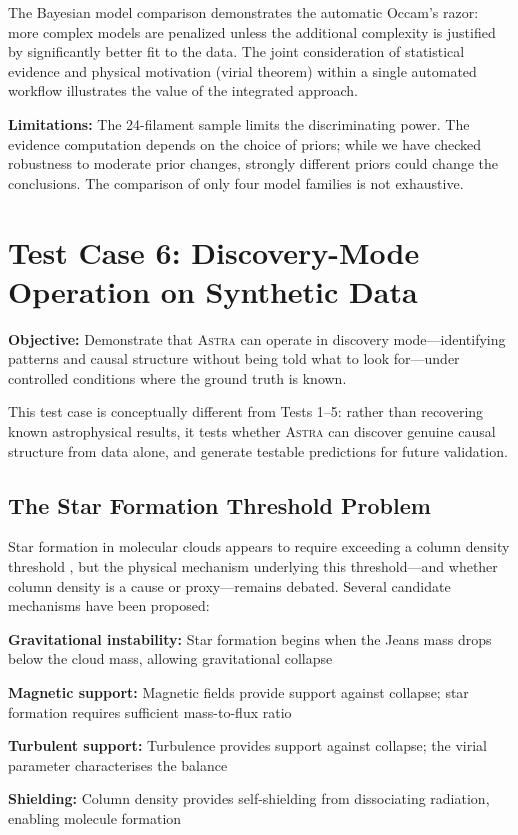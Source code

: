 \documentclass[usenatbib]{rasti}
\newcommand{\astra}{\textsc{Astra}\xspace}
\begin{document}
The Bayesian model comparison demonstrates the automatic Occam's razor: more complex models are penalized unless the additional complexity is justified by significantly better fit to the data.
The joint consideration of statistical evidence and physical motivation (virial theorem) within a single automated workflow illustrates the value of the integrated approach.

\textbf{Limitations:}
The 24-filament sample limits the discriminating power.
The evidence computation depends on the choice of priors; while we have checked robustness to moderate prior changes, strongly different priors could change the conclusions.
The comparison of only four model families is not exhaustive.

\section{Test Case 6: Discovery-Mode Operation on Synthetic Data}
\label{sec:tc6}

\textbf{Objective:} Demonstrate that \astra can operate in discovery mode---identifying patterns and causal structure without being told what to look for---under controlled conditions where the ground truth is known.

This test case is conceptually different from Tests 1--5: rather than recovering known astrophysical results, it tests whether \astra can discover genuine causal structure from data alone, and generate testable predictions for future validation.

\subsection{The Star Formation Threshold Problem}
\label{sec:tc6:problem}

Star formation in molecular clouds appears to require exceeding a column density threshold \citep{Andre2010}, but the physical mechanism underlying this threshold---and whether column density is a cause or proxy---remains debated.
Several candidate mechanisms have been proposed:
\begin{description}
  \item \textbf{Gravitational instability:} Star formation begins when the Jeans mass drops below the cloud mass, allowing gravitational collapse
  \item \textbf{Magnetic support:} Magnetic fields provide support against collapse; star formation requires sufficient mass-to-flux ratio
  \item \textbf{Turbulent support:} Turbulence provides support against collapse; the virial parameter characterises the balance
  \item \textbf{Shielding:} Column density provides self-shielding from dissociating radiation, enabling molecule formation
\end{description}
\end{document}
